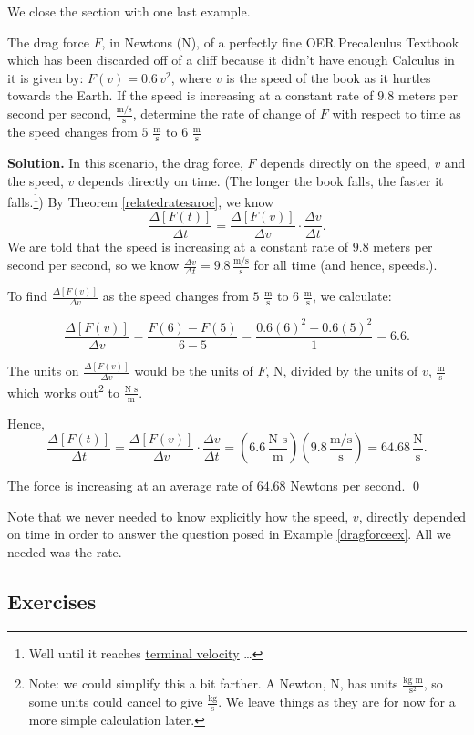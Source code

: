 \documentclass{ximera}
\begin{document}
\normalsize

We close the section with one last example.

\begin{example}\label{dragforceex} The drag force $F$, in Newtons (N), of a perfectly fine OER Precalculus Textbook which has been discarded off of a cliff because it didn't have enough Calculus in it is given by:  $F(v) = 0.6 \, v^2$, where $v$ is the speed of the book as it hurtles towards the Earth. If the speed is increasing at a constant rate of $9.8$ meters per second per second, $\frac{\text{m/s}}{\text{s}}$, determine the rate of change of $F$ with respect to time as the speed changes from $5$ $\frac{\text{m}}{\text{s}}$ to $6$ $\frac{\text{m}}{\text{s}}$

\medskip

{\bf Solution.} In this scenario, the drag force, $F$ depends directly on the speed, $v$ and the speed, $v$ depends directly on time.  (The longer the book falls, the faster it falls.\footnote{Well until it reaches \href{https://en.wikipedia.org/wiki/Terminal_velocity}{\underline{terminal velocity}} \ldots})  By Theorem \ref{relatedratesaroc}, we know \[ \dfrac{\Delta[F(t)]}{\Delta t} = \dfrac{\Delta[F(v)]}{\Delta v} \cdot \dfrac{\Delta v}{\Delta t}.\]
We are told that the speed is increasing at a constant rate of $9.8$ meters per second per second, so we know $\frac{\Delta v}{\Delta t} = 9.8 \, \frac{\text{m/s}}{\text{s}}$ for all time (and hence, speeds.).  

\medskip

To find $\frac{\Delta[F(v)]}{\Delta v}$ as the speed changes from $5$ $\frac{\text{m}}{\text{s}}$ to $6$ $\frac{\text{m}}{\text{s}}$, we calculate:

\[ \dfrac{\Delta[F(v)]}{\Delta v} = \dfrac{F(6) - F(5)}{6-5} = \dfrac{0.6 (6)^2 - 0.6 (5)^2}{1} = 6.6.\]

The units on $\frac{\Delta[F(v)]}{\Delta v}$ would be the units of $F$, N, divided by the units of $v$, $\frac{\text{m}}{\text{s}}$ which works out\footnote{Note:  we could simplify this a bit farther.  A Newton, N, has units $\frac{\text{kg m}}{\text{s}^2}$, so some units could cancel  to give   $\frac{\text{kg}}{\text{s}}$.  We leave things as they are for now for a more simple calculation later.} to $\frac{\text{N s}}{\text{m}}$.  
\medskip

Hence, \[ \dfrac{\Delta[F(t)]}{\Delta t} =  \dfrac{\Delta[F(v)]}{\Delta v} \cdot \dfrac{\Delta v}{\Delta t} = \left(6.6 \,  \frac{\text{N s}}{\text{m}} \right) \left( 9.8  \, \frac{\text{m/s}}{\text{s}} \right) = 64.68 \, \frac{\text{N}}{\text{s}} .\]

The force is increasing at an average rate of $64.68$ Newtons per second.  \qed

\end{example}

Note that we never needed to know explicitly how the speed, $v$, directly depended on time in order to answer the question posed in Example \ref{dragforceex}. All we needed was the rate.  

\newpage

\subsection{Exercises}

\closegraphsfile
\end{document}
